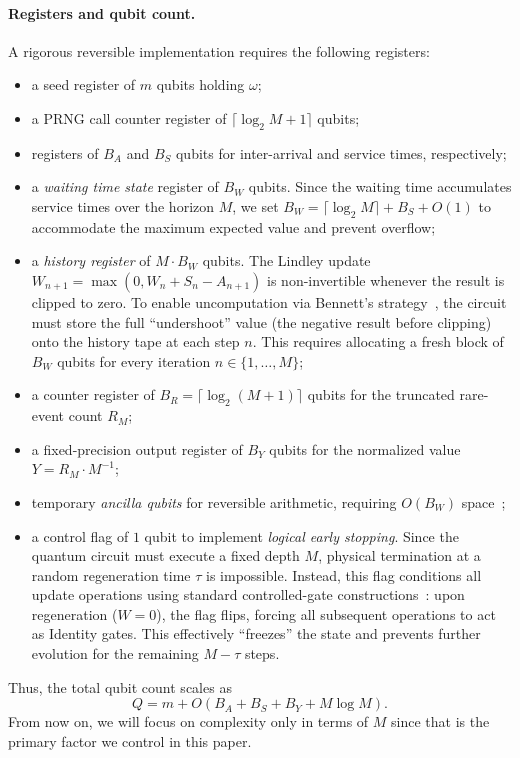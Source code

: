 \documentclass[11pt]{article}
\begin{document}
\paragraph{Registers and qubit count.}
A rigorous reversible implementation requires the following registers:
\begin{itemize}
    \item a seed register of $m$ qubits holding $\omega$;
    \item a PRNG call counter register of $\lceil \log_2 M +1\rceil$ qubits;
    \item registers of $B_A$ and $B_S$ qubits for inter-arrival and service times, respectively;
   \item a \textit{waiting time state} register of $B_W$ qubits.
Since the waiting time accumulates service times over the horizon $M$, we set $B_W = \lceil \log_2 M \rceil + B_S + O(1)$ to accommodate the maximum expected value and prevent overflow;
    \item a \textit{history register} of $M \cdot B_W$ qubits.
    The Lindley update $W_{n+1} = \max(0, W_n + S_n - A_{n+1})$ is non-invertible whenever the result is clipped to zero. To enable uncomputation via Bennett's strategy~\cite{bennett1973}, the circuit must store the full ``undershoot'' value (the negative result before clipping) onto the history tape at each step $n$. This requires allocating a fresh block of $B_W$ qubits for every iteration $n \in \{1, \dots, M\}$;
    \item a counter register of $B_R=\lceil\log_2(M+1)\rceil$ qubits for the truncated rare-event count $R_M$;
    \item a fixed-precision output register of $B_Y$ qubits for the normalized value $Y = R_M \cdot M^{-1}$;
    \item temporary \textit{ancilla qubits} for reversible arithmetic, requiring $O(B_W)$ space~\cite{cuccaro2004adder};
    \item a control flag of $1$ qubit to implement \textit{logical early stopping}.
Since the quantum circuit must execute a fixed depth $M$, physical termination at a random regeneration time $\tau$ is impossible.
Instead, this flag conditions all update operations using standard controlled-gate constructions~\cite{vedral1996}: upon regeneration ($W=0$), the flag flips, forcing all subsequent operations to act as Identity gates.
This effectively ``freezes'' the state and prevents further evolution for the remaining $M-\tau$ steps.
\end{itemize}
Thus, the total qubit count scales as
\[
Q = m +  O(B_A + B_S + B_Y + M\log M).
\]
From now on, we will focus on complexity only in terms of $M$ since that is the primary factor we control in this paper.
\end{document}
